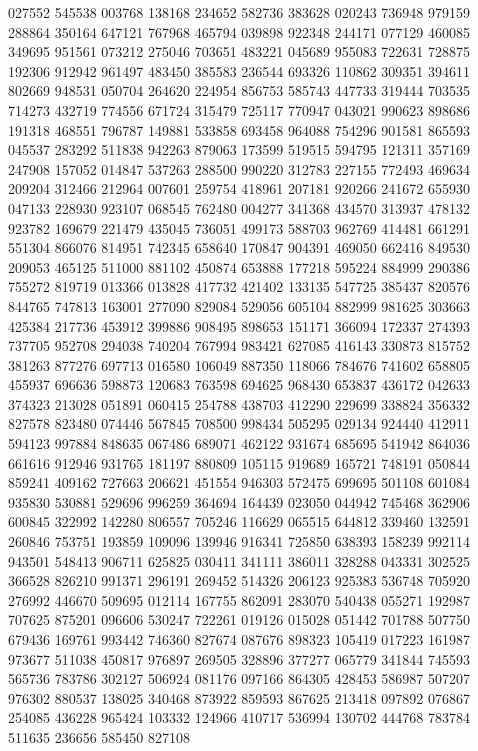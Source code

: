 {027552 545538 003768 138168 234652 582736 383628 020243 736948 979159 288864%
350164 647121 767968 465794 039898 922348 244171 077129 460085 349695 951561%
073212 275046 703651 483221 045689 955083 722631 728875 192306 912942 961497%
483450 385583 236544 693326 110862 309351 394611 802669 948531 050704 264620%
224954 856753 585743 447733 319444 703535 714273 432719 774556 671724 315479%
725117 770947 043021 990623 898686 191318 468551 796787 149881 533858 693458%
964088 754296 901581 865593 045537 283292 511838 942263 879063 173599 519515%
594795 121311 357169 247908 157052 014847 537263 288500 990220 312783 227155%
772493 469634 209204 312466 212964 007601 259754 418961 207181 920266 241672%
655930 047133 228930 923107 068545 762480 004277 341368 434570 313937 478132%
923782 169679 221479 435045 736051 499173 588703 962769 414481 661291 551304%
866076 814951 742345 658640 170847 904391 469050 662416 849530 209053 465125%
511000 881102 450874 653888 177218 595224 884999 290386 755272 819719 013366%
013828 417732 421402 133135 547725 385437 820576 844765 747813 163001 277090%
829084 529056 605104 882999 981625 303663 425384 217736 453912 399886 908495%
898653 151171 366094 172337 274393 737705 952708 294038 740204 767994 983421%
627085 416143 330873 815752 381263 877276 697713 016580 106049 887350 118066%
784676 741602 658805 455937 696636 598873 120683 763598 694625 968430 653837%
436172 042633 374323 213028 051891 060415 254788 438703 412290 229699 338824%
356332 827578 823480 074446 567845 708500 998434 505295 029134 924440 412911%
594123 997884 848635 067486 689071 462122 931674 685695 541942 864036 661616%
912946 931765 181197 880809 105115 919689 165721 748191 050844 859241 409162%
727663 206621 451554 946303 572475 699695 501108 601084 935830 530881 529696%
996259 364694 164439 023050 044942 745468 362906 600845 322992 142280 806557%
705246 116629 065515 644812 339460 132591 260846 753751 193859 109096 139946%
916341 725850 638393 158239 992114 943501 548413 906711 625825 030411 341111%
386011 328288 043331 302525 366528 826210 991371 296191 269452 514326 206123%
925383 536748 705920 276992 446670 509695 012114 167755 862091 283070 540438%
055271 192987 707625 875201 096606 530247 722261 019126 015028 051442 701788%
507750 679436 169761 993442 746360 827674 087676 898323 105419 017223 161987%
973677 511038 450817 976897 269505 328896 377277 065779 341844 745593 565736%
783786 302127 506924 081176 097166 864305 428453 586987 507207 976302 880537%
138025 340468 873922 859593 867625 213418 097892 076867 254085 436228 965424%
103332 124966 410717 536994 130702 444768 783784 511635 236656 585450 827108%
}
